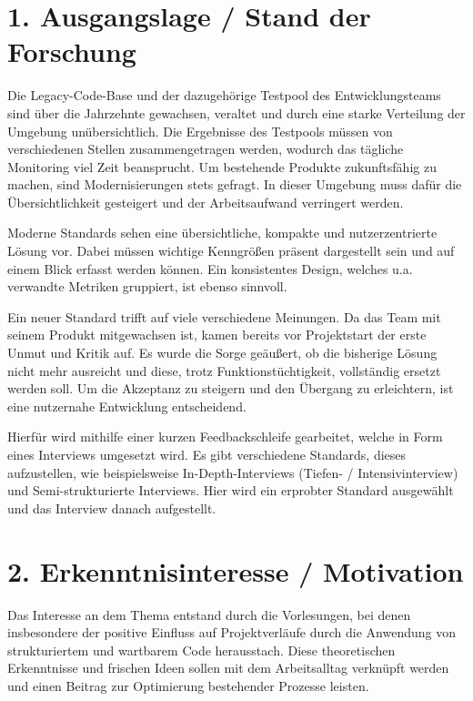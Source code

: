 \section*{1. Ausgangslage / Stand der Forschung}
Die Legacy-Code-Base und der dazugehörige Testpool des Entwicklungsteams sind über die Jahrzehnte gewachsen, veraltet und durch eine starke Verteilung der Umgebung unübersichtlich. Die Ergebnisse des Testpools müssen von verschiedenen Stellen zusammengetragen werden, wodurch das tägliche Monitoring viel Zeit beansprucht.
Um bestehende Produkte zukunftsfähig zu machen, sind Modernisierungen stets gefragt. In dieser Umgebung muss dafür die Übersichtlichkeit gesteigert und der Arbeitsaufwand verringert werden.

Moderne Standards sehen eine übersichtliche, kompakte und nutzerzentrierte Lösung vor. Dabei müssen wichtige Kenngrößen präsent dargestellt sein und auf einem Blick erfasst werden können. Ein konsistentes Design, welches u.a. verwandte Metriken gruppiert, ist ebenso sinnvoll.

Ein neuer Standard trifft auf viele verschiedene Meinungen. Da das Team mit seinem Produkt mitgewachsen ist, kamen bereits vor Projektstart der erste Unmut und Kritik auf. Es wurde die Sorge geäußert, ob die bisherige Lösung nicht mehr ausreicht und diese, trotz Funktionstüchtigkeit, vollständig ersetzt werden soll. Um die Akzeptanz zu steigern und den Übergang zu erleichtern, ist eine nutzernahe Entwicklung entscheidend.

Hierfür wird mithilfe einer kurzen Feedbackschleife gearbeitet, welche in Form eines Interviews umgesetzt wird. Es gibt verschiedene Standards, dieses aufzustellen, wie beispielsweise In-Depth-Interviews (Tiefen- / Intensivinterview) und Semi-strukturierte Interviews. Hier wird ein erprobter Standard ausgewählt und das Interview danach aufgestellt.

\section*{2. Erkenntnisinteresse / Motivation}
Das Interesse an dem Thema entstand durch die Vorlesungen, bei denen insbesondere der positive Einfluss auf Projektverläufe durch die Anwendung von strukturiertem und wartbarem Code herausstach. Diese theoretischen Erkenntnisse und frischen Ideen sollen mit dem Arbeitsalltag verknüpft werden und einen Beitrag zur Optimierung bestehender Prozesse leisten.


